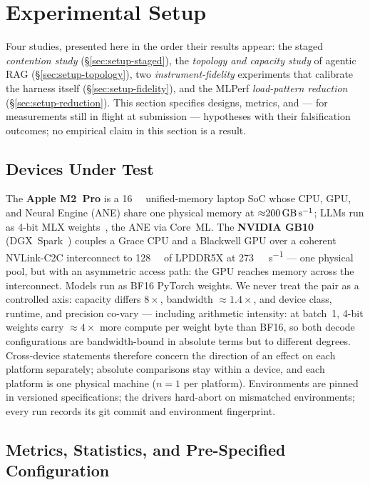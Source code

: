 \section{Experimental Setup}
\label{sec:setup}

Four studies, presented here in the order their results appear: the staged
\emph{contention study} (\S\ref{sec:setup-staged}), the \emph{topology and
capacity study} of agentic RAG (\S\ref{sec:setup-topology}), two
\emph{instrument-fidelity} experiments that calibrate the harness itself
(\S\ref{sec:setup-fidelity}), and the MLPerf \emph{load-pattern reduction}
(\S\ref{sec:setup-reduction}). This section specifies designs, metrics, and
--- for measurements still in flight at submission --- hypotheses with their
falsification outcomes; no empirical claim in this section is a result.

\subsection{Devices Under Test}
\label{sec:setup-duts}

The \textbf{Apple M2~Pro} is a \SI{16}{\giga\byte} unified-memory laptop SoC
whose CPU, GPU, and Neural Engine (ANE) share one physical memory at
${\approx}\SI{200}{\giga\byte\per\second}$; LLMs run as 4-bit MLX
weights~\cite{mlx}, the ANE via Core~ML. The \textbf{NVIDIA GB10}
(DGX~Spark~\cite{gb10}) couples a Grace CPU and a Blackwell GPU over a
coherent NVLink-C2C interconnect to \SI{128}{\giga\byte} of LPDDR5X at
\SI{273}{\giga\byte\per\second} --- one physical pool, but with an
asymmetric access path: the GPU reaches memory across the interconnect.
Models run as BF16 PyTorch weights. We never
treat the pair as a controlled axis: capacity differs $8\times$, bandwidth
${\approx}1.4\times$, and device class, runtime, and precision co-vary ---
including arithmetic intensity: at batch~1, 4-bit weights carry
${\approx}4\times$ more compute per weight byte than BF16, so both decode
configurations are bandwidth-bound in absolute terms but to different
degrees. Cross-device statements therefore
concern the direction of an effect on each platform separately; absolute
comparisons stay within a device, and each platform is one physical machine
($n{=}1$ per platform). Environments are pinned in versioned specifications;
the drivers hard-abort on mismatched environments; every run records its
git commit and environment fingerprint.

\subsection{Metrics, Statistics, and Pre-Specified Configuration}
\label{sec:setup-metrics}

